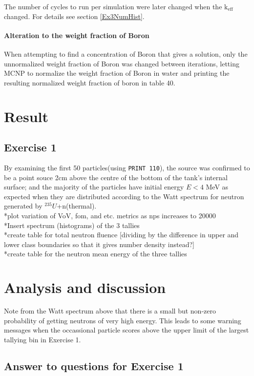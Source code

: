 \documentclass[a4paper, 12pt]{article}
\begin{document}
The number of cycles to run per simulation were later changed when the $\text{k}_{\text{eff}}$ changed. For details see section \ref{Ex3NumHist}.

\paragraph{Alteration to the weight fraction of Boron} When attempting to find a concentration of Boron that gives a solution, only the unnormalized weight fraction of Boron was changed between iterations, letting MCNP to normalize the weight fraction of Boron in water and printing the resulting normalized weight fraction of boron in table 40.

\section{Result}
\subsection{Exercise 1}
By examining the first 50 particles(using \texttt{PRINT 110}), the source was confirmed to be a point souce 2cm above the centre of the bottom of the tank's internal surface; and the majority of the particles have initial energy $E<4$ MeV as expected when they are distributed according to the Watt spectrum for neutron generated by ${}^{235}U$+n(thermal).
\\*plot variation of VoV, fom, and etc. metrics as nps increases to 20000
\\*Insert spectrum (histograms) of the 3 tallies
\\*create table for total neutron fluence
	[dividing by the difference in upper and lower class boundaries so that it gives number density instead?]
\\*create table for the neutron mean energy of the three tallies
\section{Analysis and discussion}
Note from the Watt spectrum above that there is a small but non-zero probability of getting neutrons of very high energy. This leads to some warning messages when the occassional particle scores above the upper limit of the largest tallying bin in Exercise 1.
\subsection{Answer to questions for Exercise 1}\label{Ex1Ans}
\end{document}
